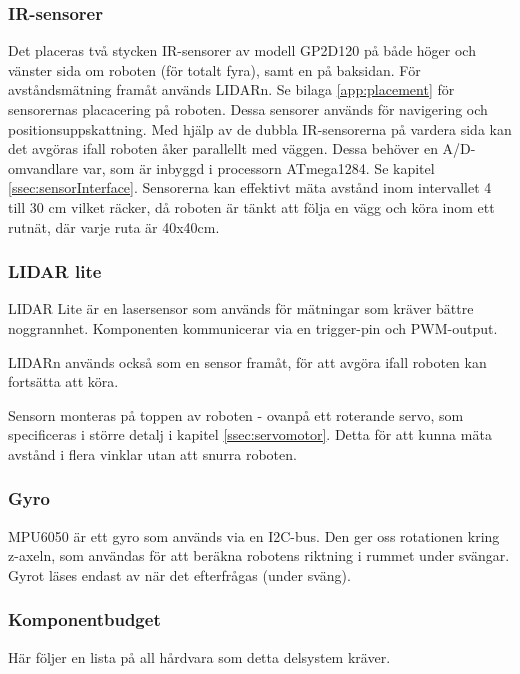 \documentclass[a4paper,11pt]{article}
\begin{document}
\subsubsection{IR-sensorer} \label{sssec:sonicsensors}
Det placeras två stycken IR-sensorer av modell GP2D120 på både höger och vänster sida om roboten (för totalt fyra), samt en på baksidan. För avståndsmätning framåt används LIDARn. Se bilaga \ref{app:placement} för sensorernas placacering på roboten. Dessa sensorer används för navigering och positionsuppskattning. Med hjälp av de dubbla IR-sensorerna på vardera sida kan det avgöras ifall roboten åker parallellt med väggen. Dessa behöver en A/D-omvandlare var, som är inbyggd i processorn ATmega1284. Se kapitel \ref{ssec:sensorInterface}. Sensorerna kan effektivt mäta avstånd inom intervallet 4 till 30 cm vilket räcker, då roboten är tänkt att följa en vägg och köra inom ett rutnät, där varje ruta är 40x40cm.


\subsubsection{LIDAR lite} \label{sssec:lidar}
LIDAR Lite är en lasersensor som används för mätningar som kräver bättre noggrannhet. Komponenten kommunicerar via en trigger-pin och PWM-output.

LIDARn används också som en sensor framåt, för att avgöra ifall roboten kan fortsätta att köra.

Sensorn monteras på toppen av roboten - ovanpå ett roterande servo, som specificeras i större detalj i kapitel \ref{ssec:servomotor}. Detta för att kunna mäta avstånd i flera vinklar utan att snurra roboten.

\subsubsection{Gyro} \label{sssec:imu}
MPU6050 är ett gyro som används via en I2C-bus. Den ger oss rotationen kring z-axeln, som användas för att beräkna robotens riktning i rummet under svängar.
Gyrot läses endast av när det efterfrågas (under sväng).

\clearpage

\subsubsection{Komponentbudget}
Här följer en lista på all hårdvara som detta delsystem kräver.
\end{document}
